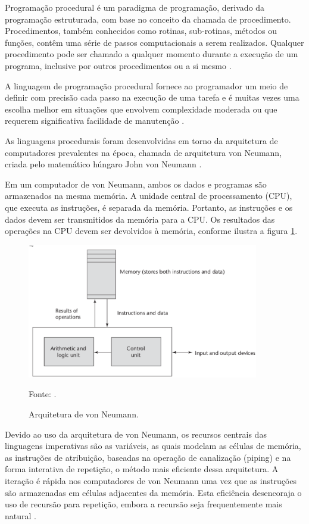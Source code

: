 Programação procedural é um paradigma de programação, derivado da programação estruturada, com base no conceito da chamada de procedimento. Procedimentos, também conhecidos como rotinas, sub-rotinas, métodos ou funções, contêm uma série de passos computacionais a serem realizados. Qualquer procedimento pode ser chamado a qualquer momento durante a execução de um programa, inclusive por outros procedimentos ou a si mesmo \cite[pág.~22]{paquet2010}.

A linguagem de programação procedural fornece ao programador  um meio de definir com precisão cada passo na execução de uma tarefa e é muitas vezes uma escolha melhor em situações que envolvem complexidade moderada ou que requerem significativa facilidade de manutenção \cite[pág.~22]{paquet2010}.

As linguagens procedurais foram desenvolvidas em torno da arquitetura de computadores prevalentes na época, chamada de  arquitetura von Neumann, criada pelo matemático húngaro John von Neumann \cite[pág.~18]{sebesta2012}.

Em um computador de von Neumann, ambos os dados e programas são armazenados na mesma memória. A unidade central de processamento (CPU), que executa as instruções, é separada da memória. Portanto, as instruções e os dados devem ser transmitidos da memória para a CPU. Os resultados das operações na CPU devem ser devolvidos à memória, conforme ilustra a figura \ref{arquiteturaVon}.

\begin{figure}[htp]
\centering
\includegraphics[width=0.9\textwidth]{figuras/arquiteturaVon}
\caption{Arquitetura de von Neumann.}{Fonte: .}
\label{arquiteturaVon}
\end{figure}

Devido ao uso da arquitetura de von Neumann, os recursos centrais das linguagens imperativas são as variáveis, as quais modelam as células de memória, as instruções de atribuição, baseadas na operação de canalização (piping) e na forma interativa de repetição, o método mais eficiente dessa arquitetura. A iteração é rápida nos computadores de von Neumann uma vez que as instruções são armazenadas em células adjacentes da memória. Esta eficiência desencoraja o uso de recursão para repetição, embora a recursão seja frequentemente mais natural \cite[pág.~18]{sebesta2012}.

